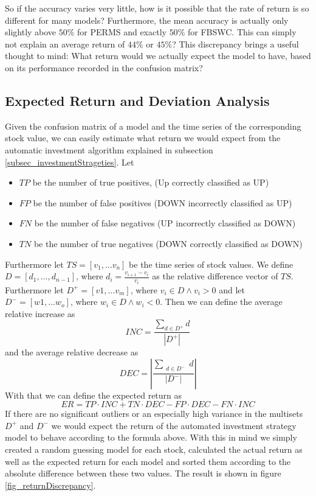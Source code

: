  So if the accuracy varies very little, how is it possible that the rate of return is so different for many models? Furthermore, the mean accuracy is actually only slightly above $50\%$ for PERMS and exactly $50\%$ for FBSWC. This can simply not explain an average return of $44\%$ or $45\%$? This discrepancy brings a useful thought to mind: What return would we actually expect the model to have, based on its performance recorded in the confusion matrix? \\

\subsection{Expected Return and Deviation Analysis}
Given the confusion matrix of a model and the time series of the corresponding stock value, we can easily estimate what return we would expect from the automatic investment algorithm explained in subsection \ref{subsec_investmentStrageties}. Let
\begin{itemize}
	\item $TP$ be the number of true positives, (Up correctly classified as UP)
	\item $FP$ be the number of false positives (DOWN incorrectly classified as UP)
	\item $FN$ be the number of false negatives (UP incorrectly classified as DOWN)
	\item $TN$ be the number of true negatives (DOWN correctly classified as DOWN)
\end{itemize}
Furthermore let $TS = [v_1,...v_n]$ be the time series of stock values. We define $D = [d_1,...,d_{n-1}]$, where $d_i = \frac{v_{i+1} - v_i}{v_i}$ as the relative difference vector of $TS$. Furthermore let $D^+ = [v1,...v_m]$, where $v_i \in D \land v_i > 0$ and let $D^- = [w1,...w_o]$, where $w_i \in D \land w_i < 0$.  Then we can define the average relative increase as \[INC  = \frac{\sum_{d \in D^+} d}{|D^+|} \] and the average relative decrease as \[ DEC = |\frac{\sum_{\substack{d \in D^-}} d}{|D^-|}| \]
With that we can define the expected return as \[ER  = TP \cdot INC + TN \cdot DEC - FP \cdot DEC - FN \cdot INC \]
If there are no significant outliers or an especially high variance in the multisets $D^+$ and $D^-$ we would expect the return of the automated investment strategy model to behave according to the formula above. With this in mind we simply created a random guessing model for each stock, calculated the actual return as well as the expected return for each model and sorted them according to the absolute difference between these two values. The result is shown in figure \ref{fig_returnDiscrepancy}.

